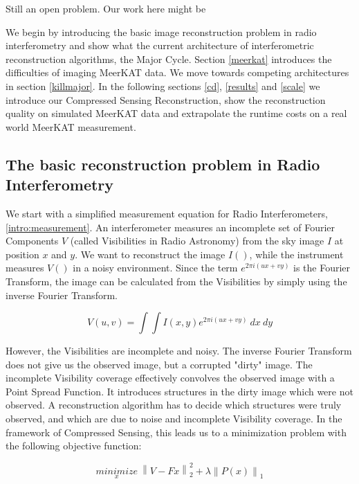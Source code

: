 Still an open problem. Our work here might be 

We begin by introducing the basic image reconstruction problem in radio interferometry and show what the current architecture of interferometric reconstruction algorithms, the Major Cycle. Section \ref{meerkat} introduces the difficulties of imaging MeerKAT data. We  move towards competing architectures in section \ref{killmajor}. In the following sections \ref{cd}, \ref{results} and \ref{scale} we introduce our Compressed Sensing Reconstruction, show the reconstruction quality on simulated MeerKAT data and extrapolate the runtime costs on a real world MeerKAT measurement.

\subsection{The basic reconstruction problem in Radio Interferometry}\label{intro:basic}
We start with a simplified measurement equation for Radio Interferometers, \eqref{intro:measurement}. An interferometer measures an incomplete set of Fourier Components $V$ (called Visibilities in Radio Astronomy) from the sky image $I$ at position $x$ and $y$. We want to reconstruct the image $I()$, while the instrument measures $V()$ in a noisy environment. Since the term $e^{2 \pi i (ux+vy)}$ is the Fourier Transform, the image can be calculated from the Visibilities by simply using the inverse Fourier Transform.

\begin{equation}\label{intro:measurement}
V(u, v) = \int\int I(x, y) e^{2 \pi i (ux+vy)} \: dx \: dy
\end{equation}

However, the Visibilities are incomplete and noisy. The inverse Fourier Transform does not give us the observed image, but a corrupted "dirty" image. The incomplete Visibility coverage effectively convolves the observed image with a Point Spread Function. It introduces structures in the dirty image which were not observed. A reconstruction algorithm has to decide which structures were truly observed, and which are due to noise and incomplete Visibility coverage. In the framework of Compressed Sensing, this leads us to a minimization problem with the following objective function:

\begin{equation}\label{intro:cs}
\underset{x}{minimize} \: \left \| V - Fx \right \|_2^2 + \lambda \left \| P(x) \right \|_1
\end{equation}

